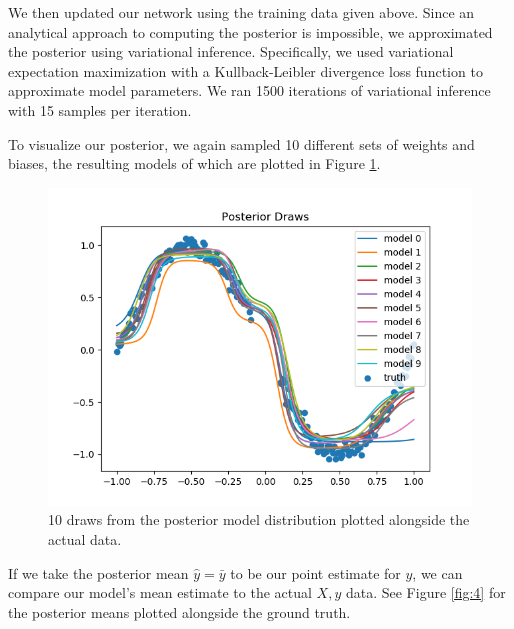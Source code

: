 \documentclass[
    preprint,
    12pt,
    letterpaper,
    longbibliography,
    nofootinbib,
    amsmath,
    amssymb,
    amsfonts,
]{revtex4-1}
\begin{document}
\newpage

We then updated our network using the training data given above. Since an analytical approach to computing the posterior is impossible, we approximated the posterior using variational inference. Specifically, we used variational expectation maximization with a Kullback-Leibler divergence loss function to approximate model parameters.\cite{klpq} We ran 1500 iterations of variational inference with 15 samples per iteration.

To visualize our posterior, we again sampled 10 different sets of weights and biases, the resulting models of which are plotted in Figure \ref{fig:3}.

\begin{figure}
\includegraphics{Figure_3.png}
\caption{10 draws from the posterior model distribution plotted alongside the actual data.}
\label{fig:3}
\end{figure}

\newpage

If we take the posterior mean $\hat y = \bar y$ to be our point estimate for $y$, we can compare our model's mean estimate to the actual $X, y$ data. See Figure \ref{fig:4} for the posterior means plotted alongside the ground truth.
\end{document}
